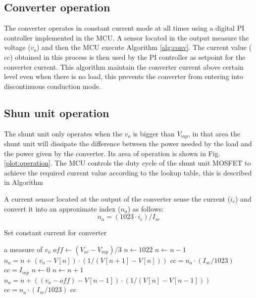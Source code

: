 \documentclass[conference]{IEEEtran}
\begin{document}
\subsection{Converter operation}
The converter operates in constant current mode at all times using a digital PI controller implemented in the MCU. A sensor located in the output measure the voltage ($v_o$) and then the MCU execute Algorithm \ref{alg:conv}. The current value ($cc$) obtained in this process is then used by the PI controller as setpoint for the converter current. This algorithm maintain the converter current above certain level even when there is no load, this prevents the converter from entering into discontinuous conduction mode. 

\subsection{Shun unit operation}
The shunt unit only operates when the $v_o$ is bigger than $V_{mp}$, in that area the shunt unit will dissipate the difference between the power needed by the load and the power given by the converter. Its area of operation is shown in Fig. \ref{plot:operation}. 
The MCU controls the duty cycle of the shunt unit MOSFET to achieve the required current value according to the lookup table, this is described in Algorithm 



A current sensor located at the output of the converter sense the current ($i_c$) and convert it into an approximate index ($n_a$) as follows:
\begin{equation}
    n_a = (1023 \cdot i_c) / I_{sc}  
\end{equation}


\begin{algorithm}
\caption{Set constant current for converter}
\label{alg:conv}
\begin{algorithmic}
\REQUIRE a measure of $v_o$
\STATE $off \leftarrow (V_{oc} - V_{mp})/3$
\STATE $n \leftarrow 1022$
\STATE $n \leftarrow n - 1$
\ENDWHILE
\STATE $n_a = n + ( v_o - V[n] ) \cdot (1 / (V[n+1] - V[n]))$
\STATE $cc = n_a \cdot (I_{sc}/1023)$ 
\STATE $cc = I_{mp}$
\ELSE
\STATE $n \leftarrow 0$
\STATE $n \leftarrow n + 1$
\ENDWHILE
\STATE $n_a = n + ((v_o - off) - V[n-1]) \cdot (1 / (V[n] - V[n-1]))$
\STATE $cc = n_a \cdot (I_{sc}/1023)$ 
\ENDIF
\RETURN $cc$
\end{algorithmic}
\end{algorithm}
\end{document}

